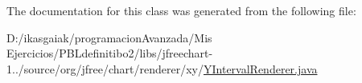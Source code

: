 The documentation for this class was generated from the following file\+:\begin{DoxyCompactItemize}
\item 
D\+:/ikasgaiak/programacion\+Avanzada/\+Mis Ejercicios/\+P\+B\+Ldefinitibo2/libs/jfreechart-\/1../source/org/jfree/chart/renderer/xy/\mbox{\hyperlink{_y_interval_renderer_8java}{Y\+Interval\+Renderer.\+java}}\end{DoxyCompactItemize}
